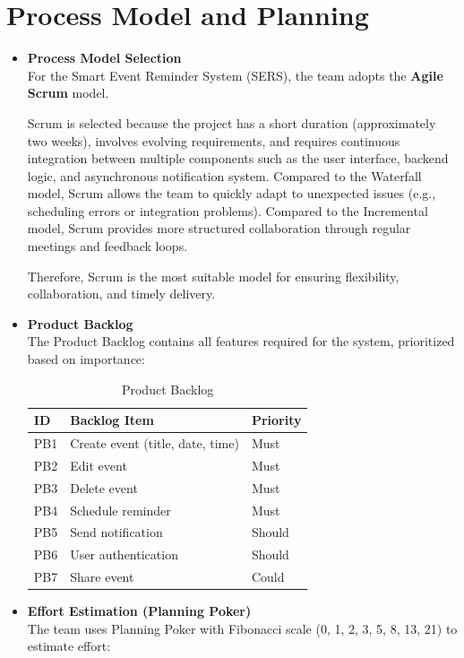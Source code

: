 \section{Process Model and Planning}
\begin{itemize}
  

\item \textbf{Process Model Selection}\\
For the Smart Event Reminder System (SERS), the team adopts the \textbf{Agile Scrum} model.

Scrum is selected because the project has a short duration (approximately two weeks), involves evolving requirements, and requires continuous integration between multiple components such as the user interface, backend logic, and asynchronous notification system. Compared to the Waterfall model, Scrum allows the team to quickly adapt to unexpected issues (e.g., scheduling errors or integration problems). Compared to the Incremental model, Scrum provides more structured collaboration through regular meetings and feedback loops.

Therefore, Scrum is the most suitable model for ensuring flexibility, collaboration, and timely delivery.

\item \textbf{Product Backlog}\\
The Product Backlog contains all features required for the system, prioritized based on importance:

\begin{table}[H]
\centering
\caption{Product Backlog}
\begin{tabular}{|l|p{}|l|}
\hline
\textbf{ID} & \textbf{Backlog Item} & \textbf{Priority} \\
\hline
PB1 & Create event (title, date, time) & Must \\
\hline
PB2 & Edit event & Must \\
\hline
PB3 & Delete event & Must \\
\hline
PB4 & Schedule reminder & Must \\
\hline
PB5 & Send notification & Should \\
\hline
PB6 & User authentication & Should \\
\hline
PB7 & Share event & Could \\
\hline
\end{tabular}
\end{table}

\item \textbf{Effort Estimation (Planning Poker)}\\
The team uses Planning Poker with Fibonacci scale (0, 1, 2, 3, 5, 8, 13, 21) to estimate effort:


\end{itemize}
